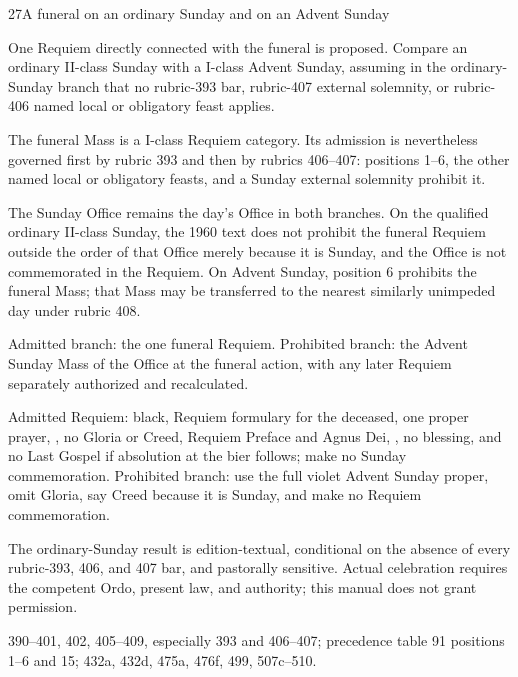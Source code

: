 \begin{casefile}{27}{A funeral on an ordinary Sunday and on an Advent Sunday}
\item[Calendar facts] One Requiem directly connected with the funeral is proposed.  Compare an ordinary II-class Sunday with a I-class Advent Sunday, assuming in the ordinary-Sunday branch that no rubric-393 bar, rubric-407 external solemnity, or rubric-406 named local or obligatory feast applies.
\item[Ranks and rows] The funeral Mass is a I-class Requiem category.  Its admission is nevertheless governed first by rubric 393 and then by rubrics 406--407: positions 1--6, the other named local or obligatory feasts, and a Sunday external solemnity prohibit it.
\item[Impeded item] The Sunday Office remains the day's Office in both branches.  On the qualified ordinary II-class Sunday, the 1960 text does not prohibit the funeral Requiem outside the order of that Office merely because it is Sunday, and the Office is not commemorated in the Requiem.  On Advent Sunday, position 6 prohibits the funeral Mass; that Mass may be transferred to the nearest similarly unimpeded day under rubric 408.
\item[Mass category] Admitted branch: the one funeral Requiem.  Prohibited branch: the Advent Sunday Mass of the Office at the funeral action, with any later Requiem separately authorized and recalculated.
\item[Assembly] Admitted Requiem: black, Requiem formulary for the deceased, one proper prayer, , no Gloria or Creed, Requiem Preface and Agnus Dei, , no blessing, and no Last Gospel if absolution at the bier follows; make no Sunday commemoration.  Prohibited branch: use the full violet Advent Sunday proper, omit Gloria, say Creed because it is Sunday, and make no Requiem commemoration.
\item[Boundary] The ordinary-Sunday result is edition-textual, conditional on the absence of every rubric-393, 406, and 407 bar, and pastorally sensitive.  Actual celebration requires the competent Ordo, present law, and authority; this manual does not grant permission.
\item[Rubric locus] 390--401, 402, 405--409, especially 393 and 406--407; precedence table 91 positions 1--6 and 15; 432a, 432d, 475a, 476f, 499, 507c--510.
\end{casefile}


